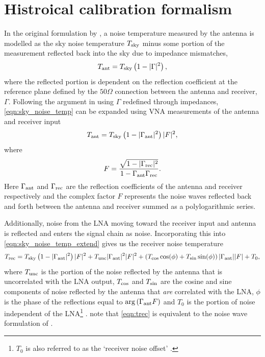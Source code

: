 \section{Histroical calibration formalism}\label{sec:historic_cal}
In the original formulation by \citet{rogersCal}, a noise temperature measured by the antenna is modelled as the sky noise temperature $T_{\mathrm{sky}}$ minus some portion of the measurement reflected back into the sky due to impedance mismatches,
\begin{equation}
    T_{\mathrm{ant}} = T_{\mathrm{sky}} \left( 1 - |\Gamma|^2 \right),
    \label{eqn:sky_noise_temp}
\end{equation}
where the reflected portion is dependent on the reflection coefficient at the reference plane defined by the $50\Omega$ connection between the antenna and receiver, $\Gamma$. Following the argument in \citep{rogersCal} using $\Gamma$ redefined through impedances, \cref{eqn:sky_noise_temp} can be expanded using VNA measurements of the antenna and receiver input
\begin{equation}
    T_{\mathrm{ant}} = T_{\mathrm{sky}} \left( 1 - |\Gamma_{\mathrm{ant}}|^2 \right) |F|^2,
    \label{eqn:sky_noise_temp_extend}
\end{equation}
where
\begin{equation}
    F = \frac{\sqrt{1-|\Gamma_{\mathrm{rec}}|^2}}{1-\Gamma_{\mathrm{ant}}\Gamma_{\mathrm{rec}}}.
    \label{eqn:f}
\end{equation}
Here $\Gamma_{\mathrm{ant}}$ and $\Gamma_{\mathrm{rec}}$ are the reflection coefficients of the antenna and receiver respectively and the complex factor $F$ represents the noise waves reflected back and forth between the antenna and receiver summed as a polylogarithmic series.

Additionally, noise from the LNA moving toward the receiver input and antenna is reflected and enters the signal chain as noise. Incorporating this into \cref{eqn:sky_noise_temp_extend} gives us the receiver noise temperature
\begin{equation}
    T_{\mathrm{rec}} = T_{\mathrm{sky}} \left( 1 - |\Gamma_{\mathrm{ant}}|^2 \right) |F|^2 + T_{\mathrm{unc}}|\Gamma_{\mathrm{ant}}|^2|F|^2 + \left( T_{\mathrm{cos}}\cos(\phi) + T_{\mathrm{sin}}\sin(\phi) \right) |\Gamma_{\mathrm{ant}}||F| + T_0,
    \label{eqn:trec}
\end{equation}
where $T_{\mathrm{unc}}$ is the portion of the noise reflected by the antenna that is uncorrelated with the LNA output, $T_{\mathrm{cos}}$ and $T_{\mathrm{sin}}$ are the cosine and sine components of noise reflected by the antenna that \textit{are} correlated with the LNA, $\phi$ is the phase of the reflections equal to $\mathrm{arg}\left(\Gamma_{\mathrm{ant}}F\right)$ and $T_0$ is the portion of noise independent of the LNA\footnote{$T_0$ is also referred to as the ‘receiver noise offset’ \citep{edgesCal}.} \citep{rogersCal}. \citet{rogersCal} note that \cref{eqn:trec} is equivalent to the noise wave formulation of \citet{meys}.

